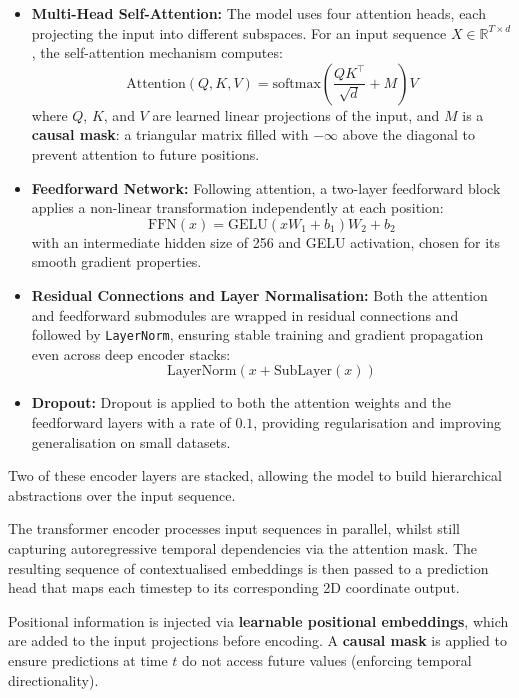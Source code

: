 \begin{itemize}
    \item \textbf{Multi-Head Self-Attention:} The model uses four attention heads, each projecting the input into different subspaces. For an input sequence $X \in \mathbb{R}^{T \times d}$, the self-attention mechanism computes:
    \[
    \text{Attention}(Q, K, V) = \text{softmax}\left( \frac{QK^\top}{\sqrt{d}} + M \right) V
    \]
    where $Q$, $K$, and $V$ are learned linear projections of the input, and $M$ is a \textbf{causal mask}: a triangular matrix filled with $-\infty$ above the diagonal to prevent attention to future positions.

    \item \textbf{Feedforward Network:} Following attention, a two-layer feedforward block applies a non-linear transformation independently at each position:
    \[
    \text{FFN}(x) = \text{GELU}(xW_1 + b_1)W_2 + b_2
    \]
    with an intermediate hidden size of 256 and GELU activation, chosen for its smooth gradient properties.

    \item \textbf{Residual Connections and Layer Normalisation:} Both the attention and feedforward submodules are wrapped in residual connections and followed by \texttt{LayerNorm}, ensuring stable training and gradient propagation even across deep encoder stacks:
    \[
    \text{LayerNorm}(x + \text{SubLayer}(x))
    \]

    \item \textbf{Dropout:} Dropout is applied to both the attention weights and the feedforward layers with a rate of $0.1$, providing regularisation and improving generalisation on small datasets.
\end{itemize}

Two of these encoder layers are stacked, allowing the model to build hierarchical abstractions over the input sequence.

The transformer encoder processes input sequences in parallel, whilst still capturing autoregressive temporal dependencies via the attention mask. The resulting sequence of contextualised embeddings is then passed to a prediction head that maps each timestep to its corresponding 2D coordinate output.

Positional information is injected via \textbf{learnable positional embeddings}, which are added to the input projections before encoding. A \textbf{causal mask} is applied to ensure predictions at time $t$ do not access future values (enforcing temporal directionality).

